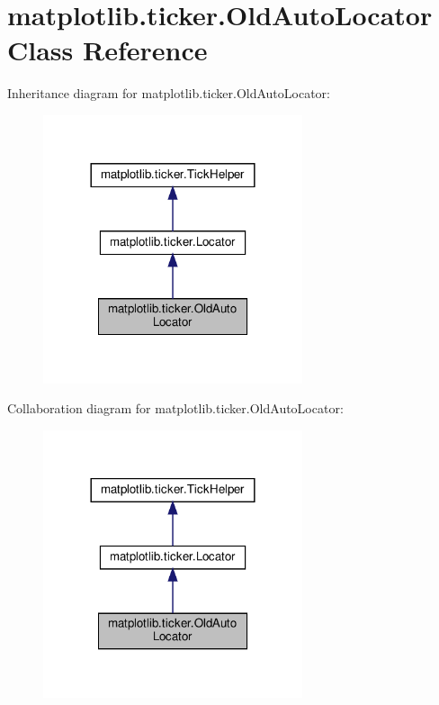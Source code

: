 \hypertarget{classmatplotlib_1_1ticker_1_1OldAutoLocator}{}\section{matplotlib.\+ticker.\+Old\+Auto\+Locator Class Reference}
\label{classmatplotlib_1_1ticker_1_1OldAutoLocator}


Inheritance diagram for matplotlib.\+ticker.\+Old\+Auto\+Locator\+:
\nopagebreak
\begin{figure}[H]
\begin{center}
\leavevmode
\includegraphics[width=216pt]{classmatplotlib_1_1ticker_1_1OldAutoLocator__inherit__graph}
\end{center}
\end{figure}


Collaboration diagram for matplotlib.\+ticker.\+Old\+Auto\+Locator\+:
\nopagebreak
\begin{figure}[H]
\begin{center}
\leavevmode
\includegraphics[width=216pt]{classmatplotlib_1_1ticker_1_1OldAutoLocator__coll__graph}
\end{center}
\end{figure}
